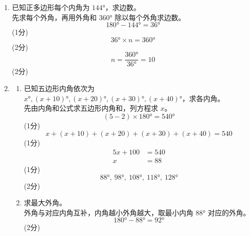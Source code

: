 \documentclass[12pt,a4paper]{exam-zh}
\begin{document}
\begin{solution}
    \begin{enumerate}[label=(\alph*)]
        \item 已知正多边形每个内角为 $144°$，求边数。 \\
        先求每个外角，再用外角和 $360°$ 除以每个外角求边数。
        \[
            180°-144° = 36°
        \]
        \hfill (1分)
        \[
            36° \times n = 360°
        \]
        \hfill (2分)
        \[
            n = \frac{360°}{36°} = 10
        \]
        \hfill (2分)

        \item
        \begin{enumerate}[label=(\roman*)]
            \item 已知五边形内角依次为 $x°,(x+10)°,(x+20)°,(x+30)°,(x+40)°$，求各内角。 \\
            先由内角和公式求五边形内角和，列方程求 $x$。
            \[
                (5-2)\times180° = 540°
            \]
            \hfill (1分)
            \[
                x+(x+10)+(x+20)+(x+30)+(x+40) = 540
            \]
            \hfill (1分)
            \begin{align*}
                5x+100 &= 540 \\
                x &= 88
            \end{align*}
            \hfill (1分)
            \[
                88°,\ 98°,\ 108°,\ 118°,\ 128°
            \]
            \hfill (2分)

            \item 求最大外角。 \\
            外角与对应内角互补，内角越小外角越大，取最小内角 $88°$ 对应的外角。
            \[
                180°-88° = 92°
            \]
            \hfill (2分)
        \end{enumerate}
    \end{enumerate}
\end{solution}
\end{document}
